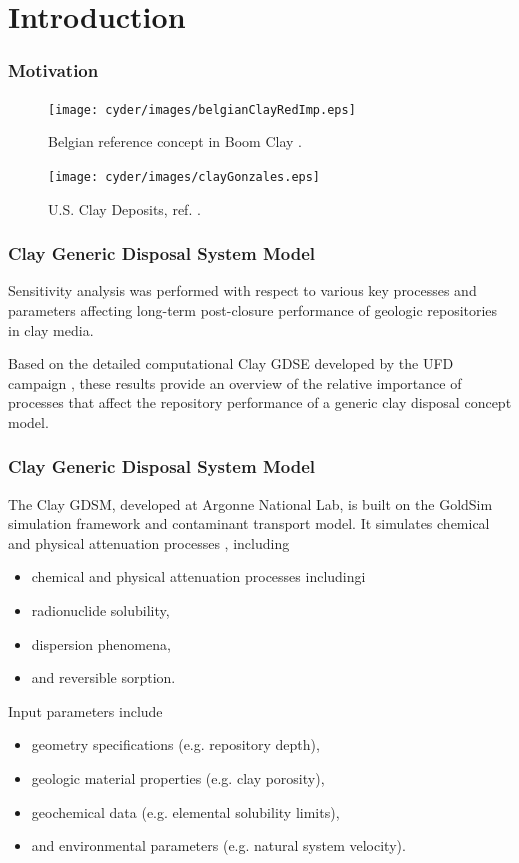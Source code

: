 
\section{Introduction}
\begin{frame}[c]
  \frametitle{Motivation}
   \begin{minipage}{0.44\textwidth}
     \begin{figure}[h!]
         \texttt{[image: cyder/images/belgianClayRedImp.eps]}
         \caption{Belgian reference concept in Boom Clay 
         \cite{von_lensa_red-impact_2008}.}
     \end{figure}
     \begin{figure}[h!]
         \texttt{[image: cyder/images/clayGonzales.eps]}
         \caption{U.S. Clay Deposits, ref. \cite{gonzales_shales_1985}.}
     \end{figure}
   \end{minipage}
   \hspace{0.01cm}
\end{frame}

\begin{frame}[c]
  \frametitle{Clay Generic Disposal System Model}
Sensitivity analysis was performed with respect to various key processes and 
parameters affecting long-term post-closure performance of geologic repositories 
in clay media. 

Based on the detailed computational Clay 
\gls{GDSE} developed by the \gls{UFD} campaign \cite{clayton_generic_2011}, 
these results provide an overview of the relative importance of processes 
that affect the repository performance of a generic clay disposal concept model. 
\end{frame}


\begin{frame}[c]
  \frametitle{Clay Generic Disposal System Model}
The Clay \gls{GDSM}, developed at Argonne National Lab, is built on the GoldSim simulation framework and contaminant transport model.  
It simulates chemical and physical attenuation processes \cite{golder_goldsim_2010, golder_goldsim_ct_2010}, including 
\begin{itemize}
  \item  chemical and physical attenuation processes includingi
  \item radionuclide solubility,
  \item dispersion phenomena,
  \item and reversible sorption.
\end{itemize}

Input parameters include 
\begin{itemize}
  \item geometry specifications (e.g. repository depth),
  \item geologic material properties (e.g. clay porosity), 
  \item geochemical data (e.g. elemental solubility limits),
  \item and environmental parameters (e.g. natural system velocity). 
\end{itemize}
\end{frame}

